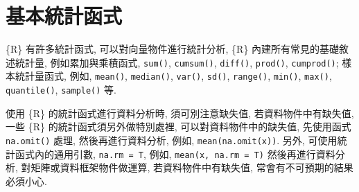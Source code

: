 \documentclass[
]{book}
\begin{document}
\hypertarget{ux57faux672cux7d71ux8a08ux51fdux5f0f}{%
\chapter{基本統計函式}\label{ux57faux672cux7d71ux8a08ux51fdux5f0f}}

\{R\} 有許多統計函式,
可以對向量物件進行統計分析,
\{R\} 內建所有常見的基礎敘述統計量,
例如累加與乘積函式,
\texttt{sum()},
\texttt{cumsum()},
\texttt{diff()},
\texttt{prod()},
\texttt{cumprod()};
樣本統計量函式,
例如,
\texttt{mean()},
\texttt{median()},
\texttt{var()},
\texttt{sd()},
\texttt{range()},
\texttt{min()},
\texttt{max()},
\texttt{quantile()},
\texttt{sample()} 等.

使用 \{R\} 的統計函式進行資料分析時,
須可別注意缺失值,
若資料物件中有缺失值,
一些 \{R\} 的統計函式須另外做特別處裡,
可以對資料物件中的缺失值,
先使用函式
\texttt{na.omit()}
處理,
然後再進行資料分析,
例如,
\texttt{mean(na.omit(x))}.
另外,
可使用統計函式內的通用引數,
\texttt{na.rm\ =\ T},
例如,
\texttt{mean(x,\ na.rm\ =\ T)}
然後再進行資料分析,
對矩陣或資料框架物件做運算,
若資料物件中有缺失值,
常會有不可預期的結果必須小心.
\end{document}
